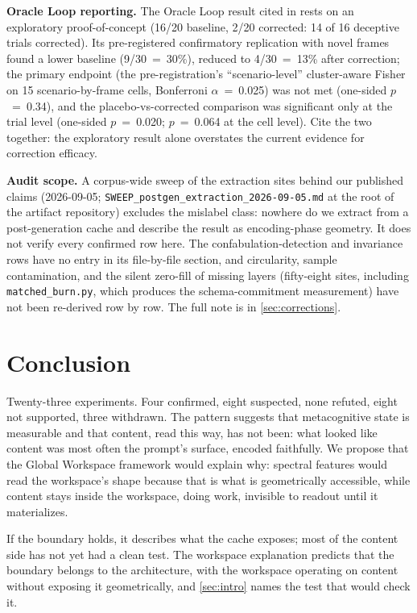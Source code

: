 \documentclass[11pt,a4paper]{article}
\begin{document}
\textbf{Oracle Loop reporting.}
The Oracle Loop result cited in  rests on an
exploratory proof-of-concept (16/20 baseline, 2/20 corrected: 14 of 16
deceptive trials corrected). Its pre-registered confirmatory
replication with novel frames found a lower baseline (9/30~=~30\%),
reduced to 4/30~=~13\% after correction; the primary endpoint (the pre-registration's ``scenario-level'' cluster-aware Fisher on 15 scenario-by-frame cells, Bonferroni $\alpha$~=~0.025) was not met (one-sided $p$~=~0.34), and the placebo-vs-corrected comparison was significant only at the trial level (one-sided $p$~=~0.020; $p$~=~0.064 at the cell level). Cite the two together: the exploratory
result alone overstates the current evidence for correction efficacy.

\textbf{Audit scope.}
A corpus-wide sweep of the extraction sites behind our published claims
(2026-09-05; \nolinkurl{SWEEP_postgen_extraction_2026-09-05.md} at the
root of the artifact repository) excludes the mislabel class: nowhere do
we extract from a post-generation cache and describe the result as
encoding-phase geometry. It does not verify every confirmed row here.
The confabulation-detection and invariance rows have no entry in its
file-by-file section, and circularity, sample contamination, and the
silent zero-fill of missing layers (fifty-eight sites, including
\texttt{matched\_burn.py}, which produces the schema-commitment measurement)
have not been re-derived row by row. The full note is in
\cref{sec:corrections}.

\section{Conclusion}
\label{sec:conclusion}

Twenty-three experiments. Four confirmed, eight suspected, none refuted,
eight not supported, three withdrawn.
The pattern suggests that metacognitive state is measurable and that
content, read this way, has not been: what looked like content was
most often the prompt's surface, encoded faithfully. We
propose that the Global Workspace framework would explain why: spectral
features would read the workspace's shape because that is what is
geometrically accessible, while content stays inside the workspace,
doing work, invisible to readout until it materializes.

If the boundary holds, it describes what the cache exposes; most of the
content side has not yet had a clean test. The workspace explanation
predicts that the boundary belongs to the architecture, with the
workspace operating on content without exposing it geometrically, and
\cref{sec:intro} names the test that would check it.
\end{document}
